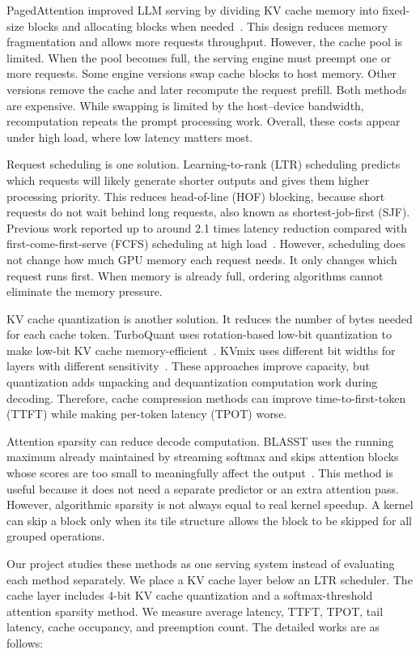 \documentclass[conference]{IEEEtran}
\begin{document}
PagedAttention improved LLM serving by dividing KV cache memory into fixed-size blocks and allocating blocks when needed~\cite{vllm2023}. This design reduces memory fragmentation and allows more requests throughput. However, the cache pool is limited. When the pool becomes full, the serving engine must preempt one or more requests. Some engine versions swap cache blocks to host memory. Other versions remove the cache and later recompute the request prefill. Both methods are expensive. While swapping is limited by the host--device bandwidth, recomputation repeats the prompt processing work. Overall, these costs appear under high load, where low latency matters most.

Request scheduling is one solution. Learning-to-rank (LTR) scheduling predicts which requests will likely generate shorter outputs and gives them higher processing priority. This reduces head-of-line (HOF) blocking, because short requests do not wait behind long requests, also known as shortest-job-first (SJF). Previous work reported up to around 2.1 times latency reduction compared with first-come-first-serve (FCFS) scheduling at high load~\cite{fu2024ltr,kumar2026}. However, scheduling does not change how much GPU memory each request needs. It only changes which request runs first. When memory is already full, ordering algorithms cannot eliminate the memory pressure.

KV cache quantization is another solution. It reduces the number of bytes needed for each cache token. TurboQuant uses rotation-based low-bit quantization to make low-bit KV cache memory-efficient~\cite{turboquant2025}. KVmix uses different bit widths for layers with different sensitivity~\cite{kvmix2026}. These approaches improve capacity, but quantization adds unpacking and dequantization computation work during decoding. Therefore, cache compression methods can improve time-to-first-token (TTFT) while making per-token latency (TPOT) worse.

Attention sparsity can reduce decode computation. BLASST uses the running maximum already maintained by streaming softmax and skips attention blocks whose scores are too small to meaningfully affect the output~\cite{blasst2025}. This method is useful because it does not need a separate predictor or an extra attention pass. However, algorithmic sparsity is not always equal to real kernel speedup. A kernel can skip a block only when its tile structure allows the block to be skipped for all grouped operations.

Our project studies these methods as one serving system instead of evaluating each method separately. We place a KV cache layer below an LTR scheduler. The cache layer includes 4-bit KV cache quantization and a softmax-threshold attention sparsity method. We measure average latency, TTFT, TPOT, tail latency, cache occupancy, and preemption count. The detailed works are as follows:
\end{document}
